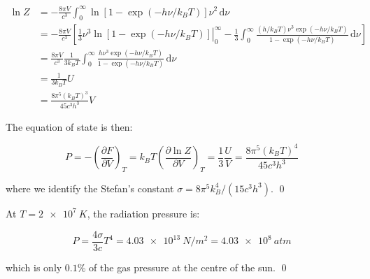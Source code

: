\documentclass[12pt]{article}
\begin{document}
\begin{equation}
    \begin{split}
        \ln{Z} &= -\frac{8\pi V}{c^{3}} \int_{0}^{\infty} \ln{\left[ 1 - \exp\left( -h \nu/k_{B}T \right) \right]} \nu^{2} \, \mathrm{d}\nu \\
        &= -\frac{8\pi V}{c^{3}} \left[ \left. \frac{1}{3} \nu^{3} \ln{\left[ 1 - \exp\left( -h \nu/k_{B}T \right) \right]} \right|_{0}^{\infty} - \frac{1}{3} \int_{0}^{\infty} \frac{(h/k_{B} T) \nu^{3} \exp\left( -h \nu/k_{B}T \right)}{1 - \exp\left( -h \nu/k_{B}T \right)} \, \mathrm{d}\nu \right] \\
        &= \frac{8\pi V}{c^{3}} \frac{1}{3k_{B} T} \int_{0}^{\infty} \frac{h \nu^{3} \exp\left( -h \nu/k_{B}T \right)}{1 - \exp\left( -h \nu/k_{B}T \right)} \, \mathrm{d}\nu \\
        &= \frac{1}{3k_{B} T} U \\
        &= \frac{8\pi^{5} (k_{B}T)^{3}}{45c^{3} h^{3}} V
    \end{split}
\end{equation}

The equation of state is then:

\begin{equation}
    P = -\left( \frac{\partial F}{\partial V} \right)_{T} = k_{B}T \left( \frac{\partial \ln{Z}}{\partial V} \right)_{T} = \frac{1}{3} \frac{U}{V} = \frac{8\pi^{5} (k_{B}T)^{4}}{45c^{3} h^{3}}
\end{equation}

where we identify the Stefan's constant $\sigma = 8\pi^{5} k_{B}^{4}/(15c^{3} h^{3})$.
\qed


At $T = \qty{2e7}{K}$, the radiation pressure is:

\begin{equation}
    P = \frac{4\sigma}{3c} T^{4} = \qty{4.03e13}{N/m^{2}} = \qty{4.03e8}{atm}
\end{equation}

which is only $0.1\%$ of the gas pressure at the centre of the sun.
\qed
\end{document}
